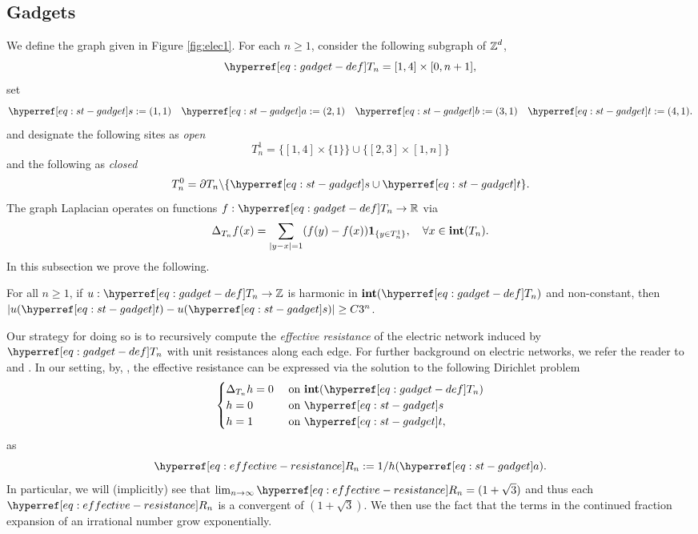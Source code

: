 \documentclass[12pt]{amsart}
\numberwithin{equation}{section}
\begin{document}
	\subsection{Gadgets} \label{subsec:gadget-def}
	We define the graph given in Figure \ref{fig:elec1}.
	For each $n \geq 1$, consider the following subgraph of $\operatorname{\mathbb{Z}}^d$, 
	\begin{equation} \label{eq:gadget-def}
		\Tn{n} =  [1,4] \times [0,n+1],
	\end{equation}
	set
	\begin{equation} \label{eq:st-gadget}
		\sgadget := (1,1) \quad \agadget := (2,1) \quad \bgadget := (3,1) \quad \tgadget := (4,1). 
	\end{equation}
	and designate the following sites as {\it open}
	\begin{equation}
		T^{1}_n =  \{[1,4] \times \{ 1 \} \}   \cup \{[2,3] \times [1,n]\}
	\end{equation}
	and the following as {\it closed}
	\begin{equation}
		T^{0}_n =  \partial T_n  \backslash \{  \sgadget \cup \tgadget \}.
	\end{equation}
	The graph Laplacian operates on functions  $f: \Tn{n} \to \R$ via
	\begin{equation}
		\Delta_{{T_{n}}} f(x) = \sum_{|y-x| =1} ( f(y) - f(x)) \mathbf{1}_{\{ y \in T^{1}_n\}}, \quad \forall x \in \operatorname{\mathbf{int}}(T_n).
	\end{equation}
	In this subsection we prove the following. 
	\begin{prop} \label{prop:exponential-growth-gadget}
		For all $n \geq 1$, if $u: \Tn{n} \to \Z$ is harmonic 
		in $\inte(\Tn{n})$ and non-constant, then  $|u(\tgadget) - u(\sgadget)| \geq C 3^n$. 
	\end{prop}
	Our strategy for doing so is to recursively compute the {\it effective resistance} of the electric network induced by $\Tn{n}$ with unit 
	resistances along each edge. For further background on electric networks, we refer the reader to \cite{doyle-snell-electric-networks} and 
	\cite[Section 2.2]{lyons-peres-book}. In our setting, by, \eg,  \cite[Equation (2.5)]{lyons-peres-book} the effective resistance can be expressed via the solution to the following Dirichlet problem  
	\begin{equation} \label{eq:escape-probability}
		\begin{cases}
			\Delta_{{T_{n}}} h = 0 &\mbox{ on $\inte(\Tn{n})$}  \\
			h = 0 &\mbox{ on $\sgadget$} \\
			h = 1 &\mbox{ on $\tgadget$},
		\end{cases}
	\end{equation}
	as
	\begin{equation} \label{eq:effective-resistance}
		\Rn{n} := 1/h(\agadget).
	\end{equation}
	In particular, we will (implicitly) see that $\lim_{n \to \infty} \Rn{n} = (1 + \sqrt{3})$ and thus
	each  $\Rn{n}$ is a convergent of $(1 + \sqrt{3})$. We then use the fact that the terms in the continued fraction expansion of an irrational number grow exponentially. 
	
\end{document}
